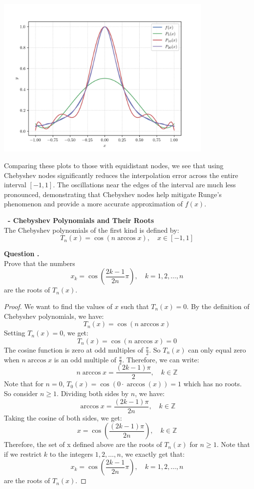 \documentclass[12pt]{article}
\newcounter{question}
\newcounter{subquest}
\newcommand{\question}[1]{
    \stepcounter{question} 
    \vspace{1em}
    \textbf{\Large\thequestion \ - #1}
    \vspace{.5em} 
    \setcounter{subquest}{0}\ \\}
\newcommand{\subquestion}{
    \stepcounter{subquest} 
    \vspace{.5em}
    \textbf{\large Question \thequestion.\thesubquest}
    \vspace{.25em}\ \\}
\begin{document}
\begin{center}
    \includegraphics[width=0.8\textwidth]{../plots_2/q2_3/chebyshev_all.png}
\end{center}

Comparing these plots to those with equidistant nodes, we see that using Chebyshev nodes significantly reduces the interpolation error across the entire interval $[-1,1]$. The oscillations near the edges of the interval are much less pronounced, demonstrating that Chebyshev nodes help mitigate Runge's phenomenon and provide a more accurate approximation of $f(x)$.

\newpage
\question{Chebyshev Polynomials and Their Roots}
The Chebyshev polynomials of the first kind is defined by:
\[T_n(x) = \cos(n \arccos x), \quad x \in [-1,1]\]

\subquestion
Prove that the numbers
\[x_k = \cos\left(\frac{2k-1}{2n} \pi\right), \quad k=1,2,\dots,n\]
are the roots of $T_n(x)$.

\begin{proof}
    We want to find the values of $x$ such that $T_n(x) = 0$. By the definition of Chebyshev polynomials, we have:
    \[T_n(x) = \cos(n \arccos x)\]
    Setting $T_n(x) = 0$, we get:
    \[T_n(x) = \cos(n \arccos x) = 0\]
    The cosine function is zero at odd multiples of $\frac{\pi}{2}$.
    So $T_n(x)$ can only equal zero when $n \arccos x$ is an odd multiple of $\frac{\pi}{2}$. Therefore, we can write:
    \[n \arccos x = \frac{(2k-1)\pi}{2}, \quad k \in \mathbb{Z}\]
    Note that for $n=0$, $T_0(x) = \cos(0\cdot \arccos(x))=1$ which has no roots. So consider $n \geq 1$. Dividing both sides by $n$, we have:
    \[\arccos x = \frac{(2k-1)\pi}{2n}, \quad k \in \mathbb{Z}\]
    Taking the cosine of both sides, we get:
    \[x = \cos\left(\frac{(2k-1)\pi}{2n}\right), \quad k \in \mathbb{Z}\]
    Therefore, the set of x defined above are the roots of $T_n(x)$ for $n\geq 1$. Note that if we restrict $k$ to the integers $1, 2, \dots, n$, we exactly get that:
    \[x_k = \cos\left(\frac{2k-1}{2n} \pi\right), \quad k=1,2,\dots,n\]
    are the roots of $T_n(x)$.
\end{proof}
\end{document}
